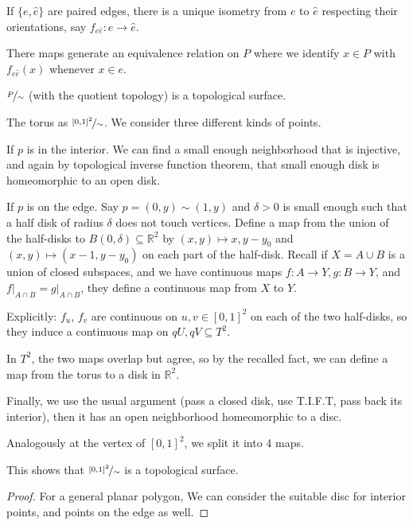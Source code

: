 \begin{enumerate}
    If \(\{e, \hat{e}\}\) are paired edges, there is a unique isometry from \(e\) to \(\hat{e} \) respecting their orientations, say \(f_{e\hat{e}}: e \to \hat{e} \).

    There maps generate an equivalence relation on \(P\) where we identify \(x \in P\) with \(f_{e \hat{e} }(x)\) whenever \(x \in e\).
    \begin{lemma}
        \(\nicefrac{P}{\sim}\) (with the quotient topology) is a topological surface.
    \end{lemma}
    \begin{example}
        The torus as \(\nicefrac{[0,1]^2}{\sim}\). We consider three different kinds of points.

        If \(p\) is in the interior. We can find a small enough neighborhood that is injective, and again by topological inverse function theorem, that small enough disk is homeomorphic to an open disk.

        If \(p\) is on the edge. Say \(p = (0,y) \sim (1,y)\) and \(\delta >0\) is small enough such that a half disk of radius \(\delta\) does not touch vertices. Define a map from the union of the half-disks to \(B(0,\delta) \subseteq \mathbb{R}^2\) by \((x,y) \mapsto x, y - y_0\) and \((x,y)\mapsto (x-1,y-y_0)\) on each part of the half-disk. Recall if \(X = A \cup B\) is a union of closed subspaces, and we have continuous maps \(f: A\to Y, g: B\to Y\), and \(\left.f\right|_{A\cap B} = \left.g\right|_{A\cap B}\), they define a continuous map from \(X\) to \(Y\).

        Explicitly: \(f_u\), \(f_v\) are continuous on \(u,v \in [0,1]^2\) on each of the two half-disks, so they induce a continuous map on \(qU, qV \subseteq T^2\).

        In \(T^2\), the two maps overlap but agree, so by the recalled fact, we can define a map from the torus to a disk in \(\mathbb{R}^2\).

        Finally, we use the usual argument (pass a closed disk, use T.I.F.T, pass back its interior), then it has an open neighborhood homeomorphic to a disc.

        Analogously at the vertex of \([0,1]^2\), we split it into 4 maps.
        
        This shows that \(\nicefrac{[0,1]^2}{\sim}\) is a topological surface.
    \end{example}
    \begin{proof}
        For a general planar polygon, We can consider the suitable disc for interior points, and points on the edge as well.


\end{proof}
\end{enumerate}
